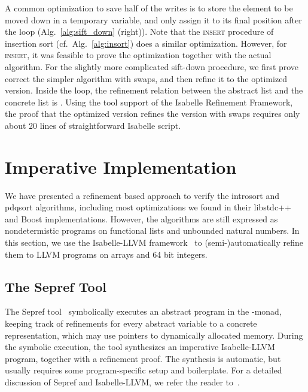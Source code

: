 \documentclass[runningheads]{llncs}
\begin{document}
  A common optimization to save half of the writes is to store the element to be moved down in a temporary variable, and only
  assign it to its final position after the loop (Alg.~\ref{alg:sift_down} (right)). Note that the \textsc{insert} procedure of insertion sort
  (cf.~Alg.~\ref{alg:insort}) does a similar optimization.
  However, for \textsc{insert}, it was feasible to prove the optimization together with the actual algorithm.
  For the slightly more complicated sift-down procedure, we first prove correct the simpler algorithm with swaps,
  and then refine it to the optimized version. Inside the loop, the refinement relation
  between the abstract list  and the concrete list  is .
  Using the tool support of the Isabelle Refinement Framework, the proof that
  the optimized version refines the version with swaps requires only about 20 lines of straightforward Isabelle script.


\section{Imperative Implementation}\label{sec:imp_impl}
  We have presented a refinement based approach to verify the introsort and pdqsort algorithms,
  including most optimizations we found in their libstdc++ and Boost implementations. However, the algorithms are still expressed
  as nondetermistic programs on functional lists and unbounded natural numbers.
  In this section, we use the Isabelle-LLVM framework~\cite{La19-llvm} to (semi-)automatically
  refine them to LLVM programs on arrays and 64 bit integers.

  \subsection{The Sepref Tool}
  The Sepref tool~\cite{La15,La19-llvm} symbolically executes an abstract program in the -monad,
  keeping track of refinements for every abstract variable to a concrete representation, which may use pointers to dynamically allocated memory.
  During the symbolic execution, the tool synthesizes an imperative Isabelle-LLVM program, together with a refinement proof.
  The synthesis is automatic, but usually requires some program-specific setup and boilerplate. For a detailed discussion of Sepref and Isabelle-LLVM,
  we refer the reader to~\cite{La15,La19-llvm}.
\end{document}
